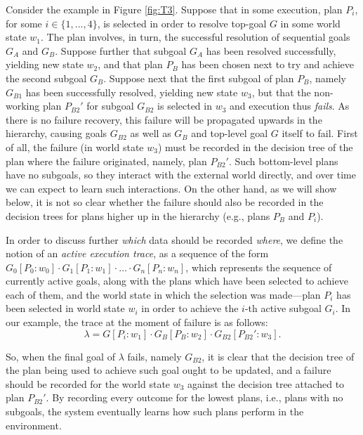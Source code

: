 Consider the example in Figure \ref{fig:T3}.
Suppose that in some execution, plan $P_i$, for some $i \in \{1,\ldots,4\}$, is
selected in order to resolve top-goal $G$ in some world state $w_1$. The plan
involves, in turn, the successful resolution of sequential goals $G_A$ and $G_B$.
Suppose further that subgoal $G_A$ has been resolved successfully, yielding new
state $w_2$, and that plan $P_B$ has been chosen next to try and achieve the
second subgoal $G_B$.
Suppose next that the first subgoal of plan $P_B$, namely $G_{B1}$ has been
successfully resolved, yielding new state $w_3$, but that the non-working plan
$P_{B2}'$ for subgoal $G_{B2}$ is selected in $w_3$ and execution thus
\emph{fails}.
As there is no failure recovery, this failure will be propagated upwards in the
hierarchy, causing goals $G_{B2}$ as well as $G_B$ and top-level goal $G$ itself
to fail.
First of all, the failure (in world state $w_3$) must be recorded in the decision
tree of the plan where the failure originated, namely, plan $P_{B2}'$. 
Such bottom-level plans have no subgoals, so they interact with the
external world directly, and over time we can expect to learn such interactions.
On the other hand, as we will show below, it is not so clear  whether the failure should also be
recorded in the decision trees for plans higher up in the hierarchy (e.g., plans
$P_B$ and $P_i$).






In order to discuss further \emph{which} data should be recorded \emph{where}, we
define the notion of an \textit{active execution trace}, as a sequence of the
form $G_0[P_0:w_0] \cdot G_1[P_1:w_1] \cdot \ldots \cdot G_n[P_n:w_n]$, which
represents the sequence of currently active goals, along with the plans which
have been selected to achieve each of them, and the world state in which the
selection was made---plan $P_i$ has been selected in world state $w_i$ in order
to achieve the $i$-th active subgoal $G_i$.
In our example, the trace at the moment of failure is as follows: \[
\lambda=G[P_i:w_1] \cdot G_B[P_B:w_2] \cdot G_{B2}[P_{B2}':w_3]. \]


So, when the final goal of $\lambda$ fails, namely $G_{B2}$, it is clear that the
decision tree of the plan being used to achieve such goal ought to be updated,
and a failure should be recorded for the world state $w_3$ against 
the decision tree attached to plan $P_{B2}'$.  
By recording every outcome for the lowest plans, i.e., plans with no subgoals,
the system eventually learns how such plans perform in the environment.

